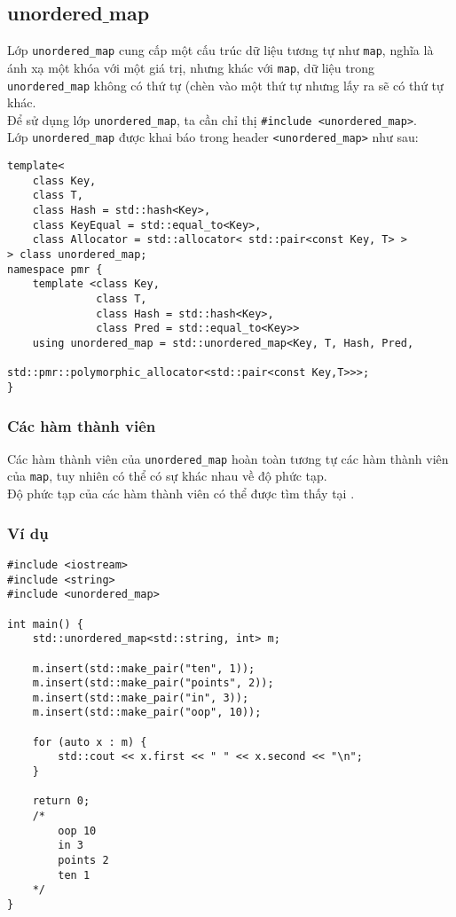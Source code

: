 \subsection{unordered$\_$map}
Lớp \lstinline{unordered_map} cung cấp một cấu trúc dữ liệu tương tự như \lstinline{map}, nghĩa là ánh xạ một khóa với một giá trị, nhưng khác với \lstinline{map}, dữ liệu trong \lstinline{unordered_map} không có thứ tự (chèn vào một thứ tự nhưng lấy ra sẽ có thứ tự khác.\\
Để sử dụng lớp \lstinline{unordered_map}, ta cần chỉ thị \lstinline{#include <unordered_map>}.\\
Lớp \lstinline{unordered_map} được khai báo trong header \lstinline{<unordered_map>} như sau: \cite{unmap}
\begin{lstlisting}
template<
    class Key,
    class T,
    class Hash = std::hash<Key>,
    class KeyEqual = std::equal_to<Key>,
    class Allocator = std::allocator< std::pair<const Key, T> >
> class unordered_map;
namespace pmr {
    template <class Key,
              class T,
              class Hash = std::hash<Key>,
              class Pred = std::equal_to<Key>>
    using unordered_map = std::unordered_map<Key, T, Hash, Pred,
                              std::pmr::polymorphic_allocator<std::pair<const Key,T>>>;
}
\end{lstlisting}
\subsubsection{Các hàm thành viên}
Các hàm thành viên của \lstinline{unordered_map} hoàn toàn tương tự các hàm thành viên của \lstinline{map}, tuy nhiên có thể có sự khác nhau về độ phức tạp.\\
Độ phức tạp của các hàm thành viên có thể được tìm thấy tại \cite{unmap}.
\subsubsection{Ví dụ}
\begin{lstlisting}
#include <iostream>
#include <string>
#include <unordered_map>

int main() {
    std::unordered_map<std::string, int> m;

    m.insert(std::make_pair("ten", 1));
    m.insert(std::make_pair("points", 2));
    m.insert(std::make_pair("in", 3));
    m.insert(std::make_pair("oop", 10));

    for (auto x : m) {
        std::cout << x.first << " " << x.second << "\n";
    }

    return 0;
    /* 
        oop 10
        in 3
        points 2
        ten 1
    */
}
\end{lstlisting}

